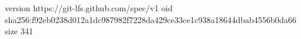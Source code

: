 version https://git-lfs.github.com/spec/v1
oid sha256:f92eb0238d012a1dc987982f7228da429ce33ce1c938a18644dbab4556b0da66
size 341
